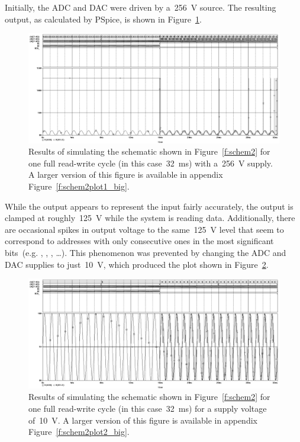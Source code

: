 Initially, the ADC and DAC were driven by a~\SI{256}{\volt} source.  The
resulting output, as calculated by PSpice, is shown in
Figure~\ref{f:schem2plot1}.
%
\begin{figure}[H]
\centering
	\includegraphics[width=.8\textwidth]{img/shot/sim2_plot1.png}
	\parbox{.8\textwidth}{
	\caption[Part 2 Simulation Results 1]{Results of simulating the schematic
	shown in Figure~\ref{f:schem2} for one full read-write cycle (in this
	case~\SI{32}{\milli\second}) with a~\SI{256}{\volt} supply.  A larger
	version of this figure is available in appendix
	Figure~\ref{f:schem2plot1_big}.}
	\label{f:schem2plot1}}
\end{figure}
%
While the output appears to represent the input fairly accurately, the output
is clamped at roughly~\SI{125}{\volt} while the system is reading data.
Additionally, there are occasional spikes in output voltage to the
same~\SI{125}{\volt} level that seem to correspond to addresses with only
consecutive ones in the most significant bits~(e.g. , , , \ldots).  This phenomenon was prevented by changing the
ADC and DAC supplies to just~\SI{10}{\volt}, which produced the plot shown in
Figure~\ref{f:schem2plot2}.
%
\begin{figure}[H]
\centering
	\includegraphics[width=.8\textwidth]{img/shot/sim2_plot2.png}
	\parbox{.8\textwidth}{
	\caption[Part 2 Simulation Results 2]{Results of simulating the schematic
	shown in Figure~\ref{f:schem2} for one full read-write cycle (in this
	case~\SI{32}{\milli\second}) for a supply voltage of~\SI{10}{\volt}.  A
	larger version of this figure is available in appendix
	Figure~\ref{f:schem2plot2_big}.}
	\label{f:schem2plot2}}
\end{figure}
%

